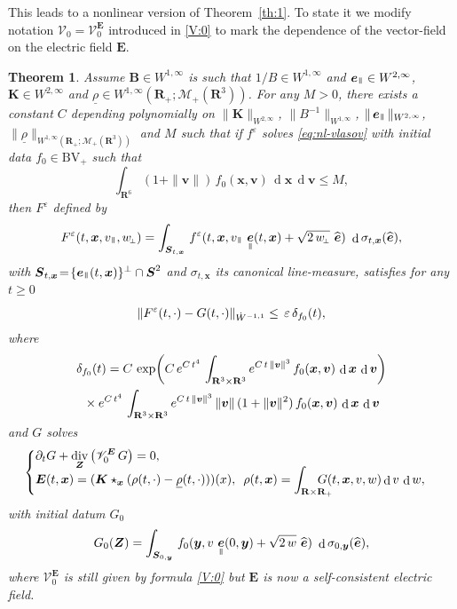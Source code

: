 \documentclass[JEP,XML,SOM,Unicode]{cedram}
\let\mathcal\mathscr
\newenvironment{splitcases}
{\begin{cases}\begin{aligned}}
{\end{aligned}\end{cases}}
\newcommand{\sperp}{{\scriptscriptstyle\perp}}
\newcommand{\BV}{\mathrm{BV}}
\let\eps\varepsilon
\let\d\partial
\DeclareMathOperator\dD{d}\let\dd\dD
\DeclareMathOperator{\Div}{div}
\theoremstyle{plain}
\newtheorem{theorem}{Theorem}[section]
\theoremstyle{definition}
\newcommand{\be}{\begin{equation}}
\newcommand{\ee}{\end{equation}}
\newcommand{\bt}{\begin{theorem}}
\newcommand{\et}{\end{theorem}}
\newcommand\R{\mathbf R}
\newcommand\bB{{\boldsymbol B}}
\newcommand\bE{{\boldsymbol E}}
\newcommand\bK{{\boldsymbol K}}
\newcommand\bS{{\boldsymbol S}}
\newcommand\bfv{{\boldsymbol v}}
\newcommand\bfx{{\boldsymbol x}}
\newcommand\bfy{{\boldsymbol y}}
\newcommand\bfZ{{\boldsymbol Z}}
\newcommand\urho{{\underline \rho}}
\newcommand\cM{{\mathcal M}}
\newcommand\cV{{\mathcal V}}
\DeclareMathOperator{\beD}{\boldsymbol{e}}
\newcommand\eDpar{\beD_\mypar}
\newcommand\eperp{w_{\!\sperp}}
\let\e w
\newcommand{\mypar}{{\mkern3mu\vphantom{\perp}\vrule depth 0pt\mkern2mu\vrule depth 0pt\mkern3mu}}
\begin{document}
This leads to a nonlinear version of Theorem~\ref{th:1}. To state it we modify notation $\cV_0=\cV_0^\bE$ introduced in \eqref{V:0} to mark the dependence of the vector-field on the electric field $\bE$.

\bt\label{th:1-nl}
Assume $\bB\in W^{1,\infty}$ is such that $1/B\in W^{1,\infty}$ and $\eDpar\in W^{2,\infty}$, $\bK\in W^{2,\infty}$ and $\urho\in W^{1,\infty}(\R_+;\cM_+(\R^3))$. For any $M>0$, there exists a constant $C$ depending polynomially on $\|\bK\|_{W^{2,\infty}}$, $\|B^{-1}\|_{W^{1,\infty}}$, $\|\eDpar\|_{W^{2,\infty}}$, $\|\urho\|_{W^{1,\infty}(\R_+;\cM_+(\R^3))}$ and $M$ such that if $f^\eps$ solves \eqref{eq:nl-vlasov} with initial data $f_0\in \BV_+$ such that
\[
\int_{\R^6}(1+\|\bfv\|)\,f_0(\bfx,\bfv)\,\dD \bfx\,\dD \bfv\leq M,
\]
then $F^\eps$ defined by
\[
F^\eps(t,\bfx,v_\mypar,\eperp)=\int_{\bS_{t,\bfx}}\,f^\eps(t,\bfx,v_\mypar\,\eDpar(t,\bfx)+\sqrt{2\,\eperp}\ \widehat{\beD})\ \dD \sigma_{t,\bfx}(\widehat{\beD}),
\]
with $\bS_{t,\bfx}\!=\!\{\eDpar(t,\bfx)\}^\perp\cap\bS^2$ and $\sigma_{t,\bfx}$ its canonical line-measure, satisfies for any $t\!\geq\!0$\vspace*{-3pt}
\[
\|F^\eps(t,\cdot)-G(t,\cdot)\|_{\dot{W}^{-1,1}}\leq \,\eps\,\delta_{f_0}(t),\vspace*{-3pt}
\]
where\vspace*{-3pt}\enlargethispage{\baselineskip}%
\begin{multline*}
\delta_{f_0}(t)=
C\,\exp\biggl(C\,e^{C\,t^4}\,\int_{\R^3\times\R^3} e^{C\,t\,\|\bfv\|^3}\,f_0(\bfx,\bfv)\,\dD\bfx\,\dD\bfv\biggr)\\
{}\times e^{C\,t^4}\,\int_{\R^3\times\R^3} e^{C\,t\,\|\bfv\|^3}\,\|\bfv\|\,(1+\|\bfv\|^2)\,f_0(\bfx,\bfv)\,\dD\bfx\,\dD\bfv\vspace*{-3pt}
\end{multline*}
and $G$ solves
\be\label{eq:1st-nl}
\begin{splitcases}
&\d_t G+\Div_\bfZ \left(\cV_0^\bE\,G \right) =0,\\[-5pt]
&\bE(t,\bfx)=(\bK\star_{\bfx}(\rho(t,\cdot)-\urho(t,\cdot)))(x),\ \,
\rho(t,\bfx)=\int_{\R\times\R_+}\hspace*{-5mm}G(t,\bfx,v,w)\dD v\,\dD w,
\end{splitcases}
\ee
with initial datum $G_0$
\be
\label{eq:1st-nlG0}
G_0(\bfZ)=\int_{\bS_{0,\bfy}}\,f_0(\bfy,v\,\eDpar(0,\bfy)+\sqrt{2\,\e}\ \widehat{\beD})\ \dD \sigma_{0,\bfy}(\widehat{\beD}),
\ee
where $\cV_0^\bE$ is still given by formula \eqref{V:0} but $\bE$ is now a self-consistent electric field.
\et
\end{document}
